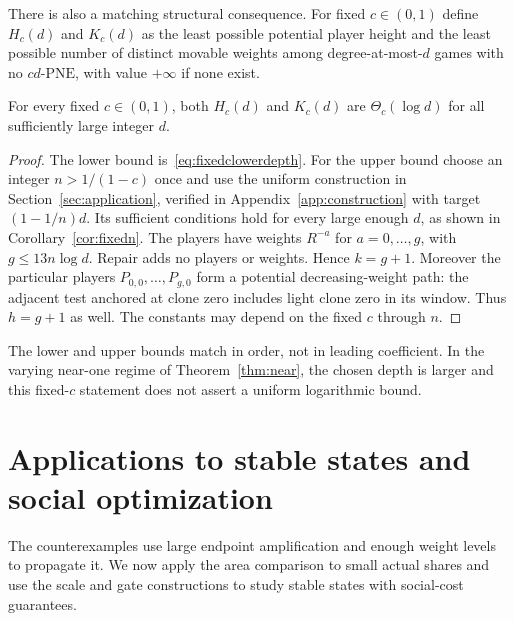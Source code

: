 \documentclass[manuscript,review,anonymous]{acmart}
\newcommand{\PNE}{\mathrm{PNE}}
\begin{document}
There is also a matching structural consequence. For fixed $c\in(0,1)$ define $H_c(d)$ and $K_c(d)$ as the least possible potential player height and the least possible number of distinct movable weights among degree-at-most-$d$ games with no $cd$-$\PNE$, with value $+\infty$ if none exist.
\begin{corollary}\label{cor:mindepth}
For every fixed $c\in(0,1)$, both $H_c(d)$ and $K_c(d)$ are $\Theta_c(\log d)$ for all sufficiently large integer $d$.
\end{corollary}
\begin{proof}
The lower bound is~\eqref{eq:fixedclowerdepth}. For the upper bound choose an integer $n>1/(1-c)$ once and use the uniform construction in Section~\ref{sec:application}, verified in Appendix~\ref{app:construction} with target $(1-1/n)d$. Its sufficient conditions hold for every large enough $d$, as shown in Corollary~\ref{cor:fixedn}. The players have weights $R^{-a}$ for $a=0,\ldots,g$, with $g\le13n\log d$. Repair adds no players or weights. Hence $k=g+1$. Moreover the particular players $P_{0,0},\ldots,P_{g,0}$ form a potential decreasing-weight path: the adjacent test anchored at clone zero includes light clone zero in its window. Thus $h=g+1$ as well. The constants may depend on the fixed $c$ through $n$.
\end{proof}
The lower and upper bounds match in order, not in leading coefficient. In the varying near-one regime of Theorem~\ref{thm:near}, the chosen depth is larger and this fixed-$c$ statement does not assert a uniform logarithmic bound.

\section{Applications to stable states and social optimization}\label{sec:positive}
The counterexamples use large endpoint amplification and enough weight levels to propagate it. We now apply the area comparison to small actual shares and use the scale and gate constructions to study stable states with social-cost guarantees.
\end{document}
